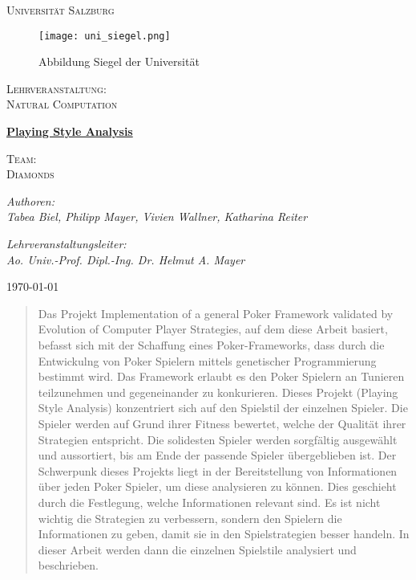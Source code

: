 \documentclass{llncs}
\begin{document}
\begin{titlepage}\centering
  
{\scshape\LARGE Universität Salzburg \par}
	\vspace{1cm}  
\begin{figure}
\centering
\texttt{[image: uni\_siegel.png]}
\caption{\label{fig:uni_siegel}Abbildung Siegel der Universität}
\end{figure}
    
	
	{\scshape\Large Lehrveranstaltung: \\
    Natural Computation\par}
	\vspace{1cm}
	{\huge\bfseries \uline{Playing Style Analysis}\par}
	\vspace{0.5cm} 
    
    {\scshape\Large Team: \\
Diamonds \par}
	\vspace{1cm}
    
	{\Large\itshape Authoren:\\ Tabea Biel, Philipp Mayer, Vivien Wallner, Katharina Reiter \par}
	\vfill
	{\Large\itshape Lehrveranstaltungsleiter: \\
	Ao. Univ.-Prof. Dipl.-Ing. Dr. Helmut A. Mayer \\ \textsc{}}

	\vfill

	{\large \today\par}
\end{titlepage}

\begin{abstract}
Das Projekt \glqq Implementation of a general Poker Framework validated by Evolution of Computer Player Strategies\grqq, auf dem diese Arbeit basiert, befasst sich mit der Schaffung eines Poker-Frameworks, dass durch die Entwickulng von Poker Spielern mittels genetischer Programmierung bestimmt wird. Das Framework erlaubt es den Poker Spielern an Tunieren teilzunehmen und gegeneinander zu konkurieren. Dieses Projekt (\glqq Playing Style Analysis\grqq) konzentriert sich auf den Spielstil der einzelnen Spieler. Die Spieler werden auf Grund ihrer Fitness bewertet, welche der Qualität ihrer Strategien entspricht. Die solidesten Spieler werden sorgfältig ausgewählt und aussortiert, bis am Ende der passende Spieler übergeblieben ist. Der Schwerpunk dieses Projekts liegt in der Bereitstellung von Informationen über jeden Poker Spieler, um diese analysieren zu können. Dies geschieht durch die Festlegung, welche Informationen relevant sind. Es ist nicht wichtig die Strategien zu verbessern, sondern den Spielern die Informationen zu geben, damit sie in den Spielstrategien besser handeln. In dieser Arbeit werden dann die einzelnen Spielstile analysiert und beschrieben.

\end{abstract}
\end{document}
